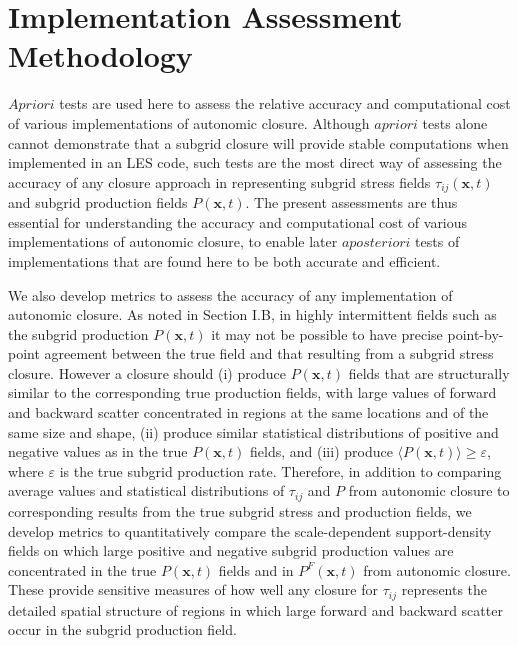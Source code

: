 \graphicspath{ {./Ch4/}  } 

\chapter{Implementation Assessment Methodology}

$A priori$ tests are used here to assess the relative accuracy and computational cost of various implementations of autonomic closure. Although $a priori$ tests alone cannot demonstrate that a subgrid closure will provide stable computations when implemented in an LES code, such tests are the most direct way of assessing the accuracy of any closure approach in representing subgrid stress fields $\tau_{ij}(\mathbf{x},t)$  and subgrid production fields $P(\mathbf{x},t)$. The present assessments are thus essential for understanding the accuracy and computational cost of various implementations of autonomic closure, to enable later $a posteriori$ tests of implementations that are found here to be both accurate and efficient. 

We also develop metrics to assess the accuracy of any implementation of autonomic closure. As noted in Section I.B, in highly intermittent fields such as the subgrid production $P(\mathbf{x},t)$ it may not be possible to have precise point-by-point agreement between the true field and that resulting from a subgrid stress closure. However a closure should (i) produce $P(\mathbf{x},t)$  fields that are structurally similar to the corresponding true production fields, with large values of forward and backward scatter concentrated in regions at the same locations and of the same size and shape, (ii) produce similar statistical distributions of positive and negative values as in the true  $P(\mathbf{x},t)$ fields, and (iii) produce $\langle P(\mathbf{x},t) \rangle \geq \varepsilon$, where  $\varepsilon$ is the true subgrid production rate. Therefore, in addition to comparing average values and statistical distributions of $\tau_{ij}$ and $P$ from autonomic closure to corresponding results from the true subgrid stress and production fields, we develop metrics to quantitatively compare the scale-dependent support-density fields on which large positive and negative subgrid production values are concentrated in the true $P(\mathbf{x},t)$  fields and in  $P^{F}(\mathbf{x},t)$ from autonomic closure. These provide sensitive measures of how well any closure for $\tau_{ij}$  represents the detailed spatial structure of regions in which large forward and backward scatter occur in the subgrid production field.
 
